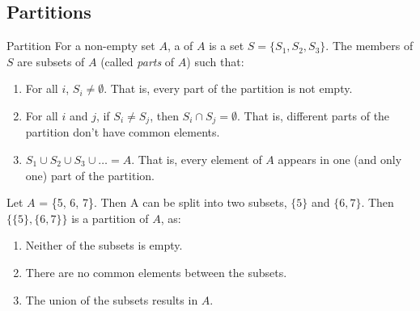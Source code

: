 \documentclass[../notes.tex]{subfiles}
\begin{document}
			\subsection{Partitions}
				\begin{definition}{Partition}
					For a non-empty set $A$, a  of $A$ is a set $S = \{S_{1}, S_{2}, S_{3}\}$. The members of $S$ are subsets of $A$ (called \emph{parts} of $A$) such that:
					\begin{enumerate}
						\item For all $i$, $S_{i} \neq \emptyset$. That is, every part of the partition is not empty.
						\item For all $i$ and $j$, if $S_{i} \neq S_{j}$, then $S_{i} \cap S_{j} = \emptyset$. That is, different parts of the partition don't have common elements.
						\item $S_{1} \cup S_{2} \cup S_{3} \cup \ldots = A$. That is, every element of $A$ appears in one (and only one) part of the partition.
					\end{enumerate}
				\end{definition}
				\begin{example}
					Let $A$ = \{5, 6, 7\}. Then A can be split into two subsets, $\{5\}$ and $\{6, 7\}$. Then $\bigl\{\{5\}, \{6, 7\}\bigr\}$ is a partition of $A$, as:
					\begin{enumerate}
						\item Neither of the subsets is empty.
						\item There are no common elements between the subsets.
						\item The union of the subsets results in $A$.
					\end{enumerate}
				\end{example}
\end{document}
